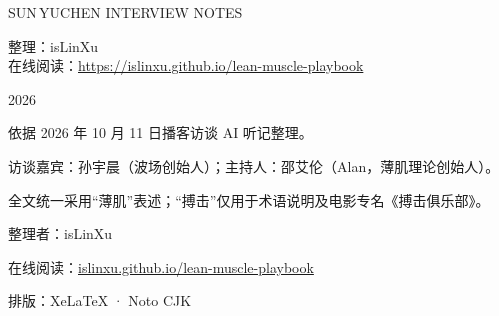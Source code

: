 \documentclass[11pt,a5paper,openany]{ctexbook}
\begin{document}
\thispagestyle{empty}
\pagecolor{bookblack}
\color{white}

\vspace*{1.2cm}
\begin{center}
  {\sffamily\fontsize{9}{13}\selectfont\color{graymuted}SUN\,YUCHEN\,\textperiodcentered\,INTERVIEW NOTES}
\end{center}
\vspace{0.8cm}

\begin{center}
  \setlength{\fboxrule}{0.8pt}\setlength{\fboxsep}{0.9em}%
\end{center}

\vspace{1.1cm}
\begin{center}
  {\sffamily\fontsize{11}{16}\selectfont\color{white}整理：isLinXu}\\[0.4em]
  {\sffamily\fontsize{10}{15}\selectfont\color{goldline}在线阅读：\href{https://islinxu.github.io/lean-muscle-playbook}{https://islinxu.github.io/lean-muscle-playbook}}
\end{center}
\vfill

\begin{center}
  {\sffamily\fontsize{10}{14}\selectfont\color{graymuted}2026}
\end{center}
\vspace*{0.5cm}

\clearpage
\nopagecolor
\color{black}

\thispagestyle{empty}
\vspace*{8.5cm}
{\small\color{graymuted}依据 2026 年 10 月 11 日播客访谈 AI 听记整理。\par}
{\small\color{graymuted}访谈嘉宾：孙宇晨（波场创始人）；主持人：邵艾伦（Alan，薄肌理论创始人）。\par}
{\small\color{graymuted}全文统一采用“薄肌”表述；“搏击”仅用于术语说明及电影专名《搏击俱乐部》。\par}
\vspace{1.2em}
{\small\color{graymuted}整理者：isLinXu\par}
{\small\color{graymuted}在线阅读：\href{https://islinxu.github.io/lean-muscle-playbook}{islinxu.github.io/lean-muscle-playbook}\par}
\vspace{1.0em}
{\small\color{graymuted}排版：XeLaTeX · Noto CJK\\[0.4em]}

\clearpage

\tableofcontents
\clearpage


\end{document}
